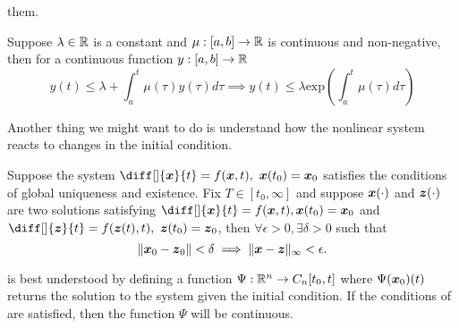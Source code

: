 them.
\begin{theorem}
	Suppose $\lambda\in\mathbb{R}$ is a constant and $\mu:[a,b]\to\mathbb{R}$ is continuous and
	non-negative, then for a continuous function $y:[a, b]\to\mathbb{R}$ \[
		y(t) \leq \lambda + \int_a^t \mu(\tau)y(\tau)d\tau \implies y(t) \leq
		\lambda \text{exp}\left(\int_a^t\mu(\tau)d\tau\right)
	\]
	\label{thm:bellman-gronwall}
\end{theorem}
Another thing we might want to do is understand how the nonlinear system reacts
to changes in the initial condition.
\begin{theorem}
	Suppose the system $\diff[]{\bs{x}}{t} = f(\bs{x}, t),\ \bs{x}(t_0) = \bs{x}_0$
	satisfies the conditions of global uniqueness and existence. Fix $T\in[t_0,
	\infty]$ and suppose $\boldsymbol{x}(\cdot)$ and $\boldsymbol{z}(\cdot)$  are two solutions
	satisfying $\diff[]{\bs{x}}{t} = f(\bs{x}, t), \bs{x}(t_0) = \bs{x}_0$ and
	$\diff[]{\bs{z}}{t} = f(\bs{z}(t), t),\ \bs{z}(t_0)=\bs{z}_0$, then $\forall
	\epsilon > 0, \exists \delta > 0$ such that \[
		\|\boldsymbol{x}_0 - \boldsymbol{z}_0\| < \delta \implies \|\boldsymbol{x} - \boldsymbol{z}\|_{\infty} <
		\epsilon.
	\]
	\label{thm:continuous-dependence-on-ic}
\end{theorem}
 is best understood by defining a function
$\Psi:\mathbb{R}^n \to C_n[t_0, t]$ where $\Psi(\boldsymbol{x}_0)(t)$ returns the solution to
the system given the initial condition. If the conditions of
 are satisfied, then the function $\Psi$
will be continuous.

